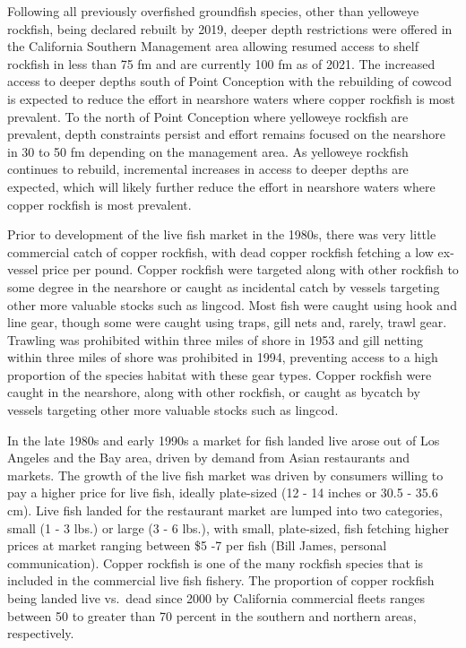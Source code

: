 \documentclass[11pt,
  english,
  letterpaper,
]{article}
\begin{document}
Following all previously overfished groundfish species, other than yelloweye rockfish, being declared rebuilt by 2019, deeper depth restrictions were offered in the California Southern Management area allowing resumed access to shelf rockfish in less than 75 fm and are currently 100 fm as of 2021. The increased access to deeper depths south of Point Conception with the rebuilding of cowcod is expected to reduce the effort in nearshore waters where copper rockfish is most prevalent. To the north of Point Conception where yelloweye rockfish are prevalent, depth constraints persist and effort remains focused on the nearshore in 30 to 50 fm depending on the management area. As yelloweye rockfish continues to rebuild, incremental increases in access to deeper depths are expected, which will likely further reduce the effort in nearshore waters where copper rockfish is most prevalent.

Prior to development of the live fish market in the 1980s, there was very little commercial catch of copper rockfish, with dead copper rockfish fetching a low ex-vessel price per pound. Copper rockfish were targeted along with other rockfish to some degree in the nearshore or caught as incidental catch by vessels targeting other more valuable stocks such as lingcod. Most fish were caught using hook and line gear, though some were caught using traps, gill nets and, rarely, trawl gear. Trawling was prohibited within three miles of shore in 1953 and gill netting within three miles of shore was prohibited in 1994, preventing access to a high proportion of the species habitat with these gear types. Copper rockfish were caught in the nearshore, along with other rockfish, or caught as bycatch by vessels targeting other more valuable stocks such as lingcod.

In the late 1980s and early 1990s a market for fish landed live arose out of Los Angeles and the Bay area, driven by demand from Asian restaurants and markets. The growth of the live fish market was driven by consumers willing to pay a higher price for live fish, ideally plate-sized (12 - 14 inches or 30.5 - 35.6 cm). Live fish landed for the restaurant market are lumped into two categories, small (1 - 3 lbs.) or large (3 - 6 lbs.), with small, plate-sized, fish fetching higher prices at market ranging between \$5 -7 per fish (Bill James, personal communication). Copper rockfish is one of the many rockfish species that is included in the commercial live fish fishery. The proportion of copper rockfish being landed live vs.~dead since 2000 by California commercial fleets ranges between 50 to greater than 70 percent in the southern and northern areas, respectively.
\end{document}
